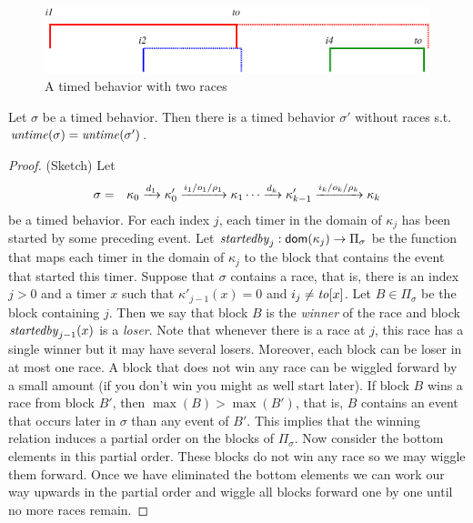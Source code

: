 \iflong
\begin{figure}[h]
\vspace{-1em}
\begin{center}
\includegraphics[width=.45\textwidth]{wiggling.pdf}
\end{center}
\caption{A timed behavior with two races}
\label{fig:races}
\end{figure}
\fi

\begin{lemma}
\label{race elimination}
Let $\sigma$ be a timed behavior.
Then there is a timed behavior $\sigma'$ without races s.t.\  $\mathit{untime}(\sigma)=\mathit{untime}(\sigma')$.
\end{lemma}
\iflong
\begin{proof}
(Sketch) Let
\begin{eqnarray*}
\sigma & = & \kappa_0 \xrightarrow{d_1} \kappa'_0 \xrightarrow{i_1/o_1/\rho_1} \kappa_1 \cdots
\xrightarrow{d_k} \kappa'_{k-1} \xrightarrow{i_k/o_k/\rho_k} \kappa_{k}
\end{eqnarray*}
be a timed behavior.
%
For each index $j$, each timer in the domain of $\kappa_j$ has been started by some preceding event.
Let $\mathit{startedby}_j : {\textsf{dom}}(\kappa_j) \rightarrow \Pi_\sigma$ be the function that maps each timer in
the domain of $\kappa_j$ to the block that contains the event that started this timer.
Suppose that $\sigma$ contains a race, that is, there is an index $j>0$ and a timer $x$  
such that $\kappa'_{j-1}(x) = 0$ and $i_j \neq \mathit{to}[x]$.
Let $B \in \Pi_\sigma$ be the block containing $j$. Then we say that block $B$ is the \emph{winner} of the race and block
$\mathit{startedby}_{j-1}(x)$ is a \emph{loser}.
Note that whenever there is a race at $j$, this race has a single winner but it may have several losers.
Moreover, each block can be loser in at most one race.
A block that does not win any race can be wiggled forward by a small amount (if you don't win you might as well start later).
If block $B$ wins a race from block $B'$, then $\max(B)>\max(B')$, that is, $B$ contains an event that occurs later
in $\sigma$ than any event of $B'$.
This implies that the winning relation induces a partial order on the blocks of $\Pi_\sigma$.
Now consider the bottom elements in this partial order. These blocks do not win any race so we may wiggle them forward.
Once we have eliminated the bottom elements we can work our way upwards in the partial order and wiggle all blocks
forward one by one until no more races remain.
\end{proof}
\fi

